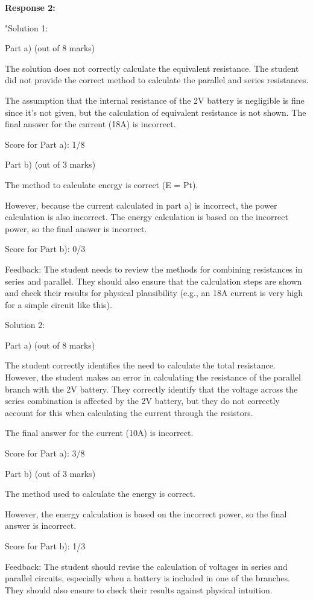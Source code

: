 \documentclass[a4paper,11pt]{article}
\begin{document}
\textbf{Response 2:}

"Solution 1:

Part a) (out of 8 marks)

The solution does not correctly calculate the equivalent resistance.
The student did not provide the correct method to calculate the parallel and series resistances.

The assumption that the internal resistance of the 2V battery is negligible is fine since it's not given, but the calculation of equivalent resistance is not shown.
The final answer for the current (18A) is incorrect.

Score for Part a): 1/8

Part b) (out of 3 marks)

The method to calculate energy is correct (E = Pt).

However, because the current calculated in part a) is incorrect, the power calculation is also incorrect.
The energy calculation is based on the incorrect power, so the final answer is incorrect.

Score for Part b): 0/3

Feedback:
The student needs to review the methods for combining resistances in series and parallel. They should also ensure that the calculation steps are shown and check their results for physical plausibility (e.g., an 18A current is very high for a simple circuit like this).

Solution 2:

Part a) (out of 8 marks)

The student correctly identifies the need to calculate the total resistance.
However, the student makes an error in calculating the resistance of the parallel branch with the 2V battery.
They correctly identify that the voltage across the series combination is affected by the 2V battery, but they do not correctly account for this when calculating the current through the resistors.

The final answer for the current (10A) is incorrect.

Score for Part a): 3/8

Part b) (out of 3 marks)

The method used to calculate the energy is correct.

However, the energy calculation is based on the incorrect power, so the final answer is incorrect.

Score for Part b): 1/3

Feedback:
The student should revise the calculation of voltages in series and parallel circuits, especially when a battery is included in one of the branches. They should also ensure to check their results against physical intuition.
\end{document}
